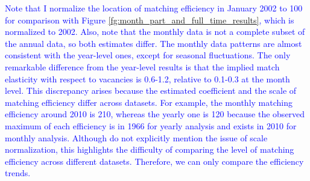\documentclass[12pt]{article}
\begin{document}
\textcolor{blue}{Note that I normalize the location of matching efficiency in January 2002 to 100 for comparison with Figure \ref{fg:month_part_and_full_time_results}, which is normalized to 2002.
Also, note that the monthly data is not a complete subset of the annual data, so both estimates differ. 
The monthly data patterns are almost consistent with the year-level ones, except for seasonal fluctuations. The only remarkable difference from the year-level results is that the implied match elasticity with respect to vacancies is 0.6-1.2, relative to 0.1-0.3 at the month level. This discrepancy arises because the estimated coefficient and the scale of matching efficiency differ across datasets. 
For example, the monthly matching efficiency around 2010 is 210, whereas the yearly one is 120 because the observed maximum of each efficiency is in 1966 for yearly analysis and exists in 2010 for monthly analysis.
Although \cite{lange2020beyond} do not explicitly mention the issue of scale normalization, this highlights the difficulty of comparing the level of matching efficiency across different datasets. Therefore, we can only compare the efficiency trends.}
\end{document}
